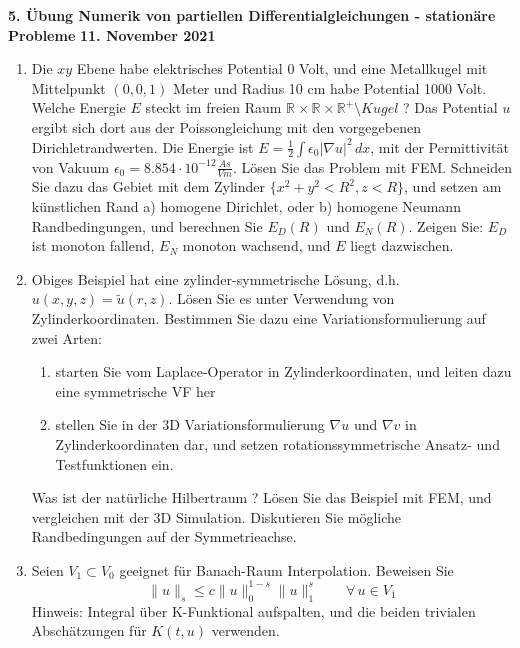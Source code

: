 \documentclass[11pt,a4paper]{report}
\newcommand{\R}[1]{\mathbb{R}^{#1}}
\begin{document}
\begin{center}
\textbf{5. \"Ubung Numerik von partiellen Differentialgleichungen - station\"are Probleme} \newline 
\textbf{11. November 2021}
\end{center}

\setcounter{enumi}{4}

\begin{enumerate}


\item
Die $xy$ Ebene habe elektrisches Potential 0 Volt, und eine Metallkugel
mit Mittelpunkt $(0,0,1)$ Meter und Radius 10 cm habe Potential 1000
Volt. Welche Energie $E$ steckt im freien Raum $\R{} \times \R{} \times
\R{+} \setminus Kugel$ ? Das Potential $u$ ergibt sich dort aus der
Poissongleichung mit den vorgegebenen Dirichletrandwerten. Die Energie
ist $E = \frac12\int
\epsilon_0 | \nabla u |^2 \, dx$, mit der Permittivit\"at von Vakuum
$\epsilon_0 = 8.854 \cdot 10^{-12} \frac{As} {Vm}$. L\"osen Sie das Problem mit FEM. Schneiden
Sie dazu das Gebiet mit dem Zylinder $\{ x^2 + y^2 < R^2, z < R \}$, und
setzen am k\"unstlichen Rand a) homogene Dirichlet, oder b) homogene
Neumann Randbedingungen, und berechnen Sie $E_D(R)$ und $E_N(R)$. 
Zeigen Sie: $E_D$ ist monoton fallend, $E_N$ monoton wachsend, und $E$
liegt dazwischen.


\item Obiges Beispiel hat eine zylinder-symmetrische
  L\"osung, d.h. $u(x,y,z) = \tilde u(r,z)$.  L\"osen Sie es unter Verwendung von Zylinderkoordinaten.
Bestimmen Sie dazu eine Variationsformulierung auf zwei Arten:
\begin{enumerate}
\item starten Sie vom Laplace-Operator in Zylinderkoordinaten, und
  leiten dazu eine symmetrische VF her
\item stellen Sie in der 3D Variationsformulierung $\nabla u$ und
  $\nabla v$ in Zylinderkoordinaten dar, und setzen
  rotationssymmetrische Ansatz- und Testfunktionen ein.
\end{enumerate}
Was ist der nat\"urliche Hilbertraum ?
L\"osen Sie das Beispiel mit FEM, und vergleichen mit der 3D Simulation. Diskutieren Sie m\"ogliche Randbedingungen auf
der Symmetrieachse.


  
 \item
Seien $V_1 \subset V_0$ geeignet f\"ur Banach-Raum Interpolation. Beweisen Sie
$$
\| u \|_{s} \leq c \|u \|_0^{1-s} \|u \|_1^s \qquad \forall \, u \in V_1
$$
Hinweis: Integral \"uber K-Funktional aufspalten, und die beiden
trivialen Absch\"atzungen f\"ur $K(t,u)$ verwenden.


\end{enumerate}
\end{document}
